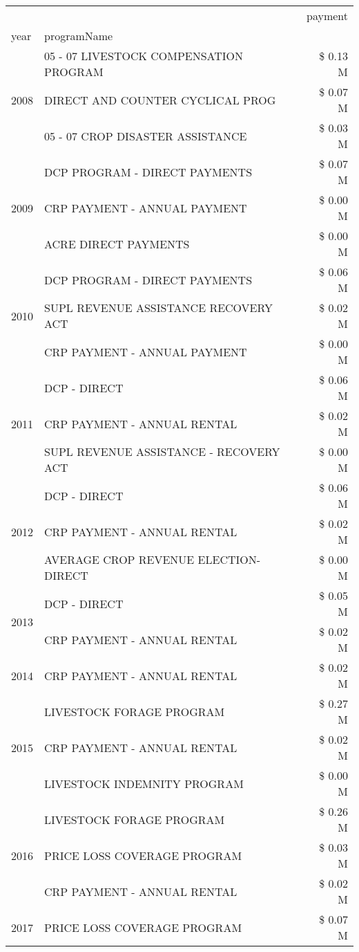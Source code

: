 \begin{tabular}{llr}
\toprule
 &  & payment \\
year & programName &  \\
\midrule
\multirow[t]{3}{*}{2008} & 05 - 07 LIVESTOCK COMPENSATION PROGRAM & \$ 0.13 M \\
 & DIRECT AND COUNTER CYCLICAL PROG & \$ 0.07 M \\
 & 05 - 07 CROP DISASTER ASSISTANCE & \$ 0.03 M \\
\cline{1-3}
\multirow[t]{3}{*}{2009} & DCP PROGRAM - DIRECT PAYMENTS & \$ 0.07 M \\
 & CRP PAYMENT - ANNUAL PAYMENT & \$ 0.00 M \\
 & ACRE DIRECT PAYMENTS & \$ 0.00 M \\
\cline{1-3}
\multirow[t]{3}{*}{2010} & DCP PROGRAM - DIRECT PAYMENTS & \$ 0.06 M \\
 & SUPL REVENUE ASSISTANCE RECOVERY ACT & \$ 0.02 M \\
 & CRP PAYMENT - ANNUAL PAYMENT & \$ 0.00 M \\
\cline{1-3}
\multirow[t]{3}{*}{2011} & DCP - DIRECT & \$ 0.06 M \\
 & CRP PAYMENT - ANNUAL RENTAL & \$ 0.02 M \\
 & SUPL REVENUE ASSISTANCE - RECOVERY ACT & \$ 0.00 M \\
\cline{1-3}
\multirow[t]{3}{*}{2012} & DCP - DIRECT & \$ 0.06 M \\
 & CRP PAYMENT - ANNUAL RENTAL & \$ 0.02 M \\
 & AVERAGE CROP REVENUE ELECTION-DIRECT & \$ 0.00 M \\
\cline{1-3}
\multirow[t]{2}{*}{2013} & DCP - DIRECT & \$ 0.05 M \\
 & CRP PAYMENT - ANNUAL RENTAL & \$ 0.02 M \\
\cline{1-3}
2014 & CRP PAYMENT - ANNUAL RENTAL & \$ 0.02 M \\
\cline{1-3}
\multirow[t]{3}{*}{2015} & LIVESTOCK FORAGE PROGRAM & \$ 0.27 M \\
 & CRP PAYMENT - ANNUAL RENTAL & \$ 0.02 M \\
 & LIVESTOCK INDEMNITY PROGRAM & \$ 0.00 M \\
\cline{1-3}
\multirow[t]{3}{*}{2016} & LIVESTOCK FORAGE PROGRAM & \$ 0.26 M \\
 & PRICE LOSS COVERAGE PROGRAM & \$ 0.03 M \\
 & CRP PAYMENT - ANNUAL RENTAL & \$ 0.02 M \\
\cline{1-3}
\multirow[t]{3}{*}{2017} & PRICE LOSS COVERAGE PROGRAM & \$ 0.07 M \\

\end{tabular}
